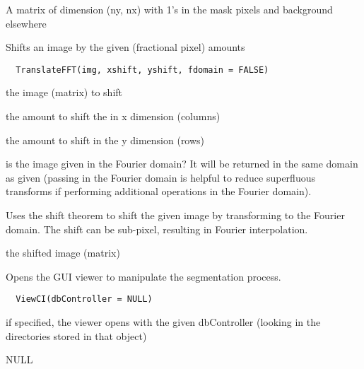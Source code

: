 \documentclass[a4paper]{book}
\begin{document}
%
\begin{Value}
A matrix of dimension (ny, nx) with 1's in the mask
pixels and background elsewhere
\end{Value}
%
\begin{Description}\relax
Shifts an image by the given (fractional pixel) amounts
\end{Description}
%
\begin{Usage}
\begin{verbatim}
  TranslateFFT(img, xshift, yshift, fdomain = FALSE)
\end{verbatim}
\end{Usage}
%
\begin{Arguments}
\begin{ldescription}
\item[\code{img}] the image (matrix) to shift

\item[\code{xshift}] the amount to shift the in x dimension
(columns)

\item[\code{yshift}] the amount to shift in the y dimension
(rows)

\item[\code{fdomain}] is the image given in the Fourier domain?
It will be returned in the same domain as given (passing
in the Fourier domain is helpful to reduce superfluous
transforms if performing additional operations in the
Fourier domain).
\end{ldescription}
\end{Arguments}
%
\begin{Details}\relax
Uses the shift theorem to shift the given image by
transforming to the Fourier domain.  The shift can be
sub-pixel, resulting in Fourier interpolation.
\end{Details}
%
\begin{Value}
the shifted image (matrix)
\end{Value}
%
\begin{Description}\relax
Opens the GUI viewer to manipulate the segmentation
process.
\end{Description}
%
\begin{Usage}
\begin{verbatim}
  ViewCI(dbController = NULL)
\end{verbatim}
\end{Usage}
%
\begin{Arguments}
\begin{ldescription}
\item[\code{dbController}] if specified, the viewer opens with
the given dbController (looking in the directories stored
in that object)
\end{ldescription}
\end{Arguments}
%
\begin{Value}
NULL
\end{Value}
\printindex{}
\end{document}

